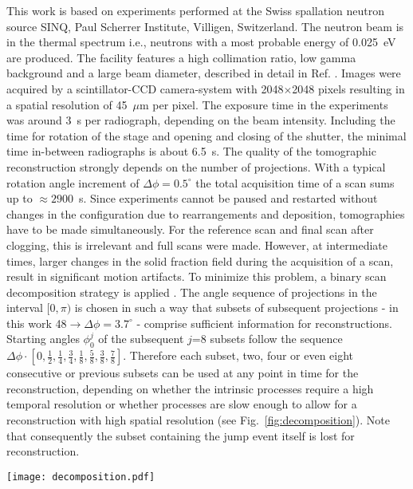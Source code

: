 \documentclass[smallextended]{svjour3}       %
\begin{document}
This work is based on experiments performed at the Swiss spallation neutron source SINQ, Paul Scherrer Institute, Villigen, Switzerland. The neutron beam is in the thermal spectrum i.e., neutrons with a most probable energy of 0.025~eV are produced. The facility features a high collimation ratio, low gamma background and a large beam diameter, described in detail in Ref. \cite{Lehmann-etal-2001}. Images were acquired by a scintillator-CCD camera-system with 2048$\times$2048 pixels resulting in a spatial resolution of 45~$\mu$m per pixel. The exposure time in the experiments was around 3~s per radiograph, depending on the beam intensity. Including the time for rotation of the stage and opening and closing of the shutter, the minimal time in-between radiographs is about 6.5~s. The quality of the tomographic reconstruction strongly depends on the number of projections. With a typical rotation angle increment of $\Delta\phi=0.5^{\circ}$ the total acquisition time of a scan sums up to $\approx 2900$~s. Since experiments cannot be paused and restarted without changes in the configuration due to rearrangements and deposition, tomographies have to be made simultaneously. For the reference scan and final scan after clogging, this is irrelevant and full scans were made. However, at intermediate times, larger changes in the solid fraction field during the acquisition of a scan, result in significant motion artifacts. To minimize this problem, a binary scan decomposition strategy is applied \cite{Kaestner-etal-2011}. The angle sequence of projections in the interval $[0,\pi)$ is chosen in such a way that subsets of subsequent projections - in this work 48$\rightarrow \Delta\phi=3.7^{\circ}$ - comprise sufficient information for reconstructions. Starting angles $\phi^j_0$ of the subsequent $j$=8 subsets follow the sequence $\Delta\phi\cdot[0,\frac{1}{2},\frac{1}{4},\frac{3}{4},\frac{1}{8},\frac{5}{8},\frac{3}{8},\frac{7}{8}]$. Therefore each subset, two, four or even eight consecutive or previous subsets can be used at any point in time for the reconstruction, depending on whether the intrinsic processes require a high temporal resolution or whether processes are slow enough to allow for a reconstruction with high spatial resolution (see Fig.~\ref{fig:decomposition}). Note that consequently the subset containing the jump event itself is lost for reconstruction.
\begin {figure*}%
\texttt{[image: decomposition.pdf]}
\caption{\label{fig:decomposition} Image acquisition strategy with binary decomposition and differential pressure evolution of sample 2. The magnification shows the possible acquisition time windows before and after an event for 1, 2, 4, or 8 subsets.}
\end{figure*}
\end{document}
